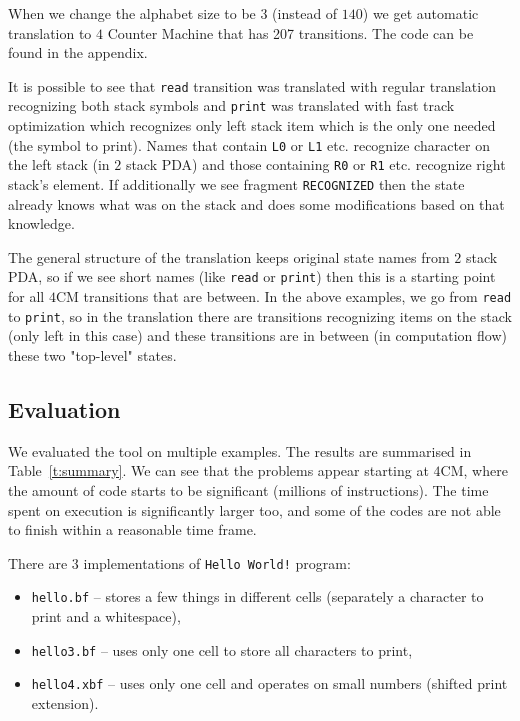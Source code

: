\documentclass[english,shortabstract,mgr]{iithesis}
\begin{document}
When we change the alphabet size to be $3$ (instead of $140$) we get
automatic translation to $4$ Counter Machine that has 207 transitions.
The code can be found in the appendix.

It is possible to see that \texttt{read} transition was translated with
regular translation recognizing both stack symbols and \texttt{print}
was translated with fast track optimization which recognizes only
left stack item which is the only one needed (the symbol to print).
Names that contain \texttt{L0} or \texttt{L1} etc. recognize character
on the left stack (in $2$ stack PDA) and those containing \texttt{R0}
or \texttt{R1} etc. recognize right stack's element. If additionally
we see fragment \texttt{RECOGNIZED} then the state already knows what
was on the stack and does some modifications based on that knowledge.

The general structure of the translation keeps original state names from
$2$ stack PDA, so if we see short names (like \texttt{read} or \texttt{print})
then this is a starting point for all $4$CM transitions that are between.
In the above examples, we go from \texttt{read} to \texttt{print}, so in
the translation there are transitions recognizing items on the stack (only left in
this case) and these transitions are in between (in computation flow) these two "top-level" states.

\subsection{Evaluation}

We evaluated the tool on multiple examples. The results are summarised
in Table~\ref{t:summary}.
We can see that the problems appear starting at $4$CM, where
the amount of code starts to be significant (millions of instructions).
The time spent on execution is significantly larger too,
and some of the codes are not able to finish within a reasonable time frame.

There are $3$ implementations of \texttt{Hello World!} program:
\begin{itemize}
  \item \texttt{hello.bf} -- stores a few things in different cells
      (separately a character to print and a whitespace),
  \item \texttt{hello3.bf} -- uses only one cell to store all characters to print,
  \item \texttt{hello4.xbf} -- uses only one cell and operates on small numbers
      (shifted print extension).
\end{itemize}
\end{document}
